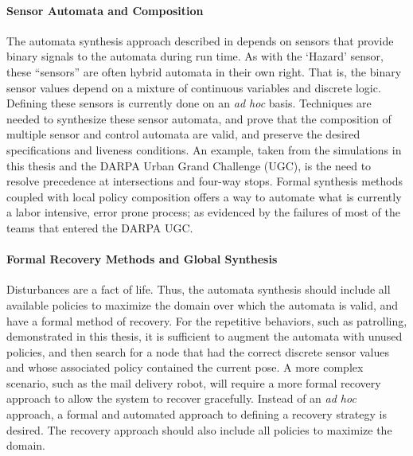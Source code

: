 \paragraph{Sensor Automata and Composition}
The automata synthesis approach described in  depends on sensors
that provide binary signals to the automata during run time.  As with the `Hazard'
sensor, these ``sensors'' are often hybrid automata in their own right.  That is, the
binary sensor values depend on a mixture of continuous variables and discrete logic.
Defining these sensors is currently done on an \emph{ad hoc} basis.  Techniques are
needed to synthesize these sensor automata, and prove that the composition of
multiple sensor and control automata are valid, and preserve the desired
specifications and liveness conditions.  An example, taken from the simulations in
this thesis and the DARPA Urban Grand Challenge (UGC), is the need to resolve
precedence at intersections and four-way stops.  Formal synthesis methods coupled
with local policy composition offers a way to automate what is currently a labor
intensive, error prone process; as evidenced by the failures of most of the teams
that entered the DARPA UGC.

\paragraph{Formal Recovery Methods and Global Synthesis}
Disturbances are a fact of life.  Thus, the automata synthesis should include all
available policies to maximize the domain over which the automata is valid, and have
a formal method of recovery.  For the repetitive behaviors, such as patrolling,
demonstrated in this thesis, it is sufficient to augment the automata with unused
policies, and then search for a node that had the correct discrete sensor values and
whose associated policy contained the current pose.  A more complex scenario, such as
the mail delivery robot, will require a more formal recovery approach to allow the
system to recover gracefully.  Instead of an \emph{ad hoc} approach, a formal and
automated approach to defining a recovery strategy is desired.  The recovery approach
should also include all policies to maximize the domain.

